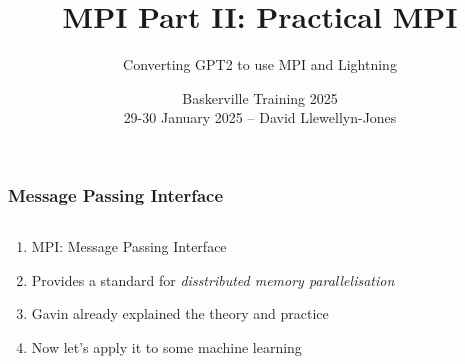 \documentclass[
	notes=none,
	aspectratio=169
]{beamer}
\begin{document}
\title{MPI Part II: Practical MPI}
\subtitle{Converting GPT2 to use MPI and Lightning}
\author{Baskerville Training 2025\\29-30 January 2025 -- David Llewellyn-Jones}


\renewcommand{\thefootnote}{\arabic{footnote}}

\frame{
\titlepage
}
\note{
}

\renewcommand{\thefootnote}{\fnsymbol{footnote}}


\begin{frame}
\frametitle{Message Passing Interface}

\begin{columns}[T]
\begin{column}[T]{1.0\textwidth}
\setlength{\parskip}{0.5em}

\vspace{-0.5cm}
\begin{enumerate}
\setlength{\parskip}{0.5em}
\item MPI: Message Passing Interface
\item Provides a standard for {\it disstributed memory parallelisation}
\item Gavin already explained the theory and practice
\item Now let's apply it to some machine learning
\end{enumerate}

\end{column}
\end{columns}

\end{frame}
\note{
}

\end{document}
